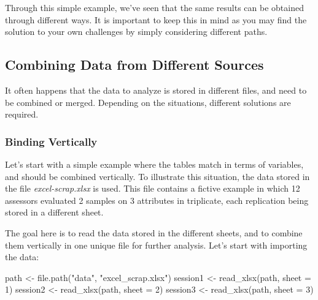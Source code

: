 \documentclass[
]{krantz}
\makeatletter
\newenvironment{Shaded}{\begin{snugshade}}{\end{snugshade}}
\newcommand{\AttributeTok}[1]{\textcolor[rgb]{0.61,0.61,0.61}{#1}}
\newcommand{\DecValTok}[1]{\textcolor[rgb]{0.06,0.06,0.06}{#1}}
\newcommand{\FunctionTok}[1]{\textcolor[rgb]{0,0,0}{#1}}
\newcommand{\NormalTok}[1]{#1}
\newcommand{\OtherTok}[1]{\textcolor[rgb]{0.37,0.37,0.37}{#1}}
\newcommand{\StringTok}[1]{\textcolor[rgb]{0.5,0.5,0.5}{#1}}
\newenvironment{kframe}{%
\medskip{}
\setlength{\fboxsep}{.8em}
 \def\at@end@of@kframe{}%
 \ifinner\ifhmode%
  \def\at@end@of@kframe{\end{minipage}}%
  \begin{minipage}{\columnwidth}%
 \fi\fi%
 \def\FrameCommand##1{\hskip\@totalleftmargin \hskip-\fboxsep
 \colorbox{shadecolor}{##1}\hskip-\fboxsep
     \hskip-\linewidth \hskip-\@totalleftmargin \hskip\columnwidth}%
 \MakeFramed {\advance\hsize-\width
   \@totalleftmargin\z@ \linewidth\hsize
   \@setminipage}}%
 {\par\unskip\endMakeFramed%
 \at@end@of@kframe}
\renewenvironment{Shaded}{\begin{kframe}}{\end{kframe}}
\makeatother
\begin{document}
Through this simple example, we've seen that the same results can be obtained through different ways. It is important to keep this in mind as you may find the solution to your own challenges by simply considering different paths.

\hypertarget{combining-data-from-different-sources}{%
\subsection{Combining Data from Different Sources}\label{combining-data-from-different-sources}}

It often happens that the data to analyze is stored in different files, and need to be combined or merged. Depending on the situations, different solutions are required.

\hypertarget{binding-vertically}{%
\subsubsection*{Binding Vertically}\label{binding-vertically}}


Let's start with a simple example where the tables match in terms of variables, and should be combined vertically. To illustrate this situation, the data stored in the file \emph{excel-scrap.xlsx} is used. This file contains a fictive example in which 12 assessors evaluated 2 samples on 3 attributes in triplicate, each replication being stored in a different sheet.

The goal here is to read the data stored in the different sheets, and to combine them vertically in one unique file for further analysis. Let's start with importing the data:

\begin{Shaded}
\begin{Highlighting}[]
\NormalTok{path }\OtherTok{\textless{}{-}} \FunctionTok{file.path}\NormalTok{(}\StringTok{"data"}\NormalTok{, }\StringTok{"excel\_scrap.xlsx"}\NormalTok{)}
\NormalTok{session1 }\OtherTok{\textless{}{-}} \FunctionTok{read\_xlsx}\NormalTok{(path, }\AttributeTok{sheet =} \DecValTok{1}\NormalTok{)}
\NormalTok{session2 }\OtherTok{\textless{}{-}} \FunctionTok{read\_xlsx}\NormalTok{(path, }\AttributeTok{sheet =} \DecValTok{2}\NormalTok{)}
\NormalTok{session3 }\OtherTok{\textless{}{-}} \FunctionTok{read\_xlsx}\NormalTok{(path, }\AttributeTok{sheet =} \DecValTok{3}\NormalTok{)}
\end{Highlighting}
\end{Shaded}
\end{document}
